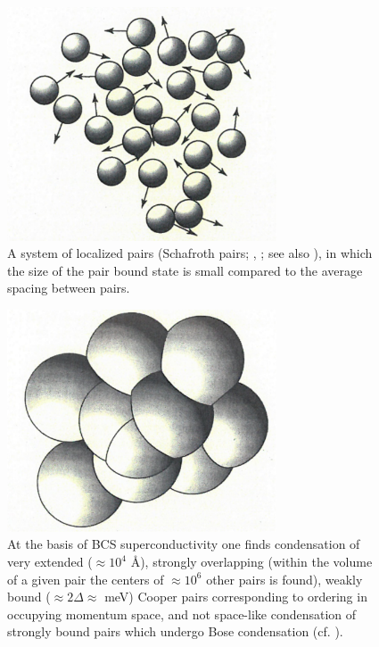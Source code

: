  
\begin{figure}
\centerline{\includegraphics*[width=8cm,angle=0]{nutshell/figs/fig1A4.pdf}}
\caption[A system of localized pairs in which the size of the pair bound state is small compared to the average spacing between pairs.]{A system of localized pairs (Schafroth pairs; \cite{Schafroth:58}, \cite{Schafroth:57}; see also \cite{Schrieffer:64}), in which the size of the pair bound state is small compared to the average spacing between pairs.}\label{fig1A4}
\end{figure}
\begin{figure}
\centerline{\includegraphics*[width=8cm,angle=0]{nutshell/figs/fig1A5.pdf}}
\caption[BCS condensation.]{At the basis of BCS superconductivity one finds condensation of very extended ($\approx10^{4}$ \AA), strongly overlapping (within the volume of a given pair the centers of $\approx10^6$ other pairs is found), weakly bound ($\approx2\Delta\approx$ meV) Cooper pairs corresponding to ordering in occupying momentum space, and not space-like condensation of strongly bound pairs which undergo Bose condensation (cf. \cite{Schrieffer:64}).}\label{fig1A5}
\end{figure}
 
